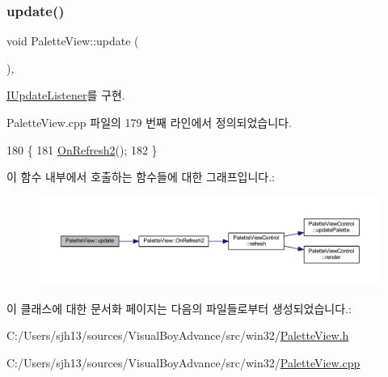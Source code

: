 \mbox{\label{class_palette_view_a94549cb400d23e790497c4263bf1e09b}} 
\subsubsection{\texorpdfstring{update()}{update()}}
{\footnotesize\ttfamily void Palette\+View\+::update (\begin{DoxyParamCaption}{ }\end{DoxyParamCaption})\hspace{0.3cm}{\ttfamily [protected]}, {\ttfamily [virtual]}}



\mbox{\hyperlink{class_i_update_listener_ac03b85f52e858d0bbd08a4984b2cb929}{I\+Update\+Listener}}를 구현.



Palette\+View.\+cpp 파일의 179 번째 라인에서 정의되었습니다.


\begin{DoxyCode}
180 \{
181   \mbox{\hyperlink{class_palette_view_ae5eaa6866be56bc87f8fe73033947c7d}{OnRefresh2}}();
182 \}
\end{DoxyCode}
이 함수 내부에서 호출하는 함수들에 대한 그래프입니다.\+:
\nopagebreak
\begin{figure}[H]
\begin{center}
\leavevmode
\includegraphics[width=350pt]{class_palette_view_a94549cb400d23e790497c4263bf1e09b_cgraph}
\end{center}
\end{figure}


이 클래스에 대한 문서화 페이지는 다음의 파일들로부터 생성되었습니다.\+:\begin{DoxyCompactItemize}
\item 
C\+:/\+Users/sjh13/sources/\+Visual\+Boy\+Advance/src/win32/\mbox{\hyperlink{_palette_view_8h}{Palette\+View.\+h}}\item 
C\+:/\+Users/sjh13/sources/\+Visual\+Boy\+Advance/src/win32/\mbox{\hyperlink{_palette_view_8cpp}{Palette\+View.\+cpp}}\end{DoxyCompactItemize}

